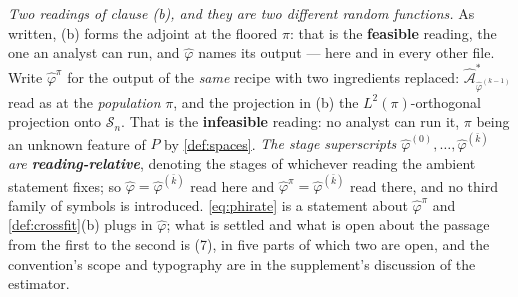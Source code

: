 \begin{definition}
\emph{Two readings of clause \textup{(b)}, and they are two different random functions.} As written,
\textup{(b)} forms the adjoint at the floored $\hat\pi$: that is the \textbf{feasible} reading, the
one an analyst can run, and $\hat\varphi$ names its output --- here and in every other file. Write
$\hat\varphi^{\pi}$ for the output of the \emph{same} recipe with two ingredients replaced:
$\hat{\mathcal A}^\ast_{\hat\varphi^{(k-1)}}$ read as  at the \emph{population} $\pi$,
and the projection in \textup{(b)} the $L^{2}(\pi)$-orthogonal projection onto $\mathcal S_n$. That is
the \textbf{infeasible} reading: no analyst can run it, $\pi$ being an unknown feature of $P$ by
\cref{def:spaces}. \emph{The stage superscripts $\hat\varphi^{(0)},\dots,\hat\varphi^{(\bar k)}$ are
\textbf{reading-relative}}, denoting the stages of whichever reading the ambient statement fixes; so
$\hat\varphi=\hat\varphi^{(\bar k)}$ read here and $\hat\varphi^{\pi}=\hat\varphi^{(\bar k)}$ read
there, and no third family of symbols is introduced. \eqref{eq:phirate} is a statement about
$\hat\varphi^{\pi}$ and \cref{def:crossfit}\textup{(b)} plugs in $\hat\varphi$; what is settled and
what is open about the passage from the first to the second is
\textup{(7)}, in five parts of which two are open, and the convention's
scope and typography are in the supplement's discussion of the estimator.

\end{definition}
